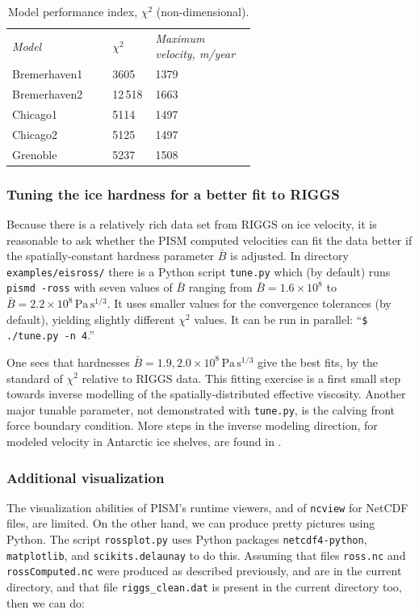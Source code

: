 \documentclass[11pt,final]{amsart}
\renewcommand{\t}[1]{\texttt{#1}}
\begin{document}
\small
\begin{table}[ht]
\centering
\caption{Model performance index, $\chi^2$ (non-dimensional).  }\label{tab:chisqr}
\begin{tabular}{p{0.2\linewidth}p{0.1\linewidth}p{0.3\linewidth}}\hline
\textsl{Model} & $\chi^2$ & \textsl{Maximum velocity, m/year} \\
Bremerhaven1 & 3605 & 1379 \\
Bremerhaven2 & 12\,518 & 1663 \\
Chicago1 & 5114 & 1497 \\
Chicago2 & 5125 & 1497 \\
Grenoble & 5237 & 1508 \\
\hline
\end{tabular}
\end{table}
\normalsize

\subsubsection*{Tuning the ice hardness for a better fit to RIGGS}  Because there is a relatively rich data set from RIGGS on ice velocity, it is reasonable to ask whether the PISM computed velocities can fit the data better if the spatially-constant hardness parameter $\bar B$ is adjusted.  In directory \verb|examples/eisross/| there is a Python script \verb|tune.py| which (by default) runs \verb|pismd -ross| with seven values of $\bar B$ ranging from $\bar B = 1.6  \times 10^8$ to $\bar B = 2.2 \times 10^8 \, \text{Pa}\, \text{s}^{1/3}$.  It uses smaller values for the convergence tolerances (by default), yielding slightly different $\chi^2$ values.  It can be run in parallel: ``\verb|$ ./tune.py -n 4|.''

One sees that hardnesses $\bar B = 1.9,2.0 \times 10^8 \, \text{Pa}\, \text{s}^{1/3}$ give the best fits, by the standard of $\chi^2$ relative to RIGGS data.  This fitting exercise is a first small step towards inverse modelling of the spatially-distributed effective viscosity.  Another major tunable parameter, not demonstrated with \verb|tune.py|, is the calving front force boundary condition.  More steps in the inverse modeling direction, for modeled velocity in Antarctic ice shelves, are found in \cite{HumbertGreveHutter,RommelaereMacAyeal}.


\subsubsection*{Additional visualization}  The visualization abilities of PISM's runtime viewers, and of \verb|ncview| for NetCDF files, are limited.  On the other hand, we can produce pretty pictures using Python.  The script \verb|rossplot.py| uses Python packages \verb|netcdf4-python|, \verb|matplotlib|, and \t{scikits.delaunay} to do this.  Assuming that files \verb|ross.nc| and \verb|rossComputed.nc| were produced as described previously, and are in the current directory, and that file \verb|riggs_clean.dat| is present in the current directory too, then we can do:
\end{document}
